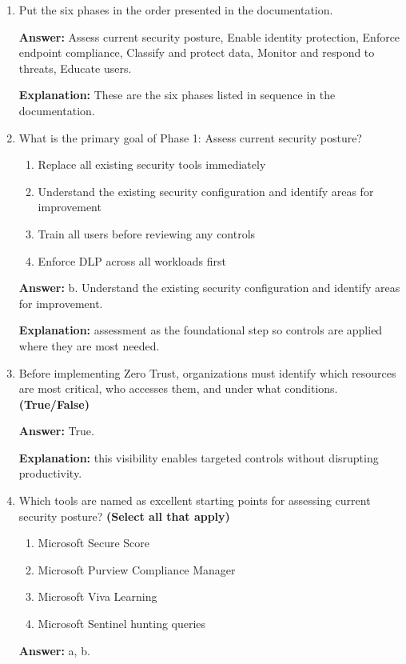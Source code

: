 \documentclass[10pt]{article}
\begin{document}
\begin{enumerate}[leftmargin=*]
\textbf{Explanation:} organizations should progress through six phases.

\item Put the six phases in the order presented in the documentation.

\textbf{Answer:} Assess current security posture, Enable identity protection, Enforce endpoint compliance, Classify and protect data, Monitor and respond to threats, Educate users.

\textbf{Explanation:} These are the six phases listed in sequence in the documentation.

\item What is the primary goal of Phase 1: Assess current security posture?
\begin{enumerate}[label=\alph*., leftmargin=1.5em]
\item Replace all existing security tools immediately
\item Understand the existing security configuration and identify areas for improvement
\item Train all users before reviewing any controls
\item Enforce DLP across all workloads first
\end{enumerate}
\textbf{Answer:} b. Understand the existing security configuration and identify areas for improvement.

\textbf{Explanation:} assessment as the foundational step so controls are applied where they are most needed.

\item Before implementing Zero Trust, organizations must identify which resources are most critical, who accesses them, and under what conditions. \textbf{(True/False)}

\textbf{Answer:} True.

\textbf{Explanation:} this visibility enables targeted controls without disrupting productivity.

\item Which tools are named as excellent starting points for assessing current security posture? \textbf{(Select all that apply)}
\begin{enumerate}[label=\alph*., leftmargin=1.5em]
\item Microsoft Secure Score
\item Microsoft Purview Compliance Manager
\item Microsoft Viva Learning
\item Microsoft Sentinel hunting queries
\end{enumerate}
\textbf{Answer:} a, b.


\end{enumerate}
\end{document}
